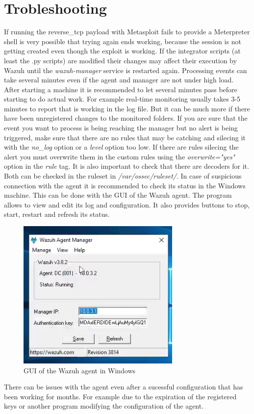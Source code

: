 \section*{Trobleshooting}
If running the reverse\_tcp payload with Metasploit fails to provide a Meterpreter shell is very possible that trying again ends working, because the session is not getting created even though the exploit is working.
\linej
\linej
If the integrator scripts (at least the .py scripts) are modified their changes may affect their execution by Wazuh until the \textit{wazuh-manager} service is restarted again.
\linej
\linej
Processing events can take several minutes even if the agent and manager are not under high load.
After starting a machine it is recommended to let several minutes pass before starting to do actual work.
\linej
For example real-time monitoring usually takes 3-5 minutes to report that is working in the log file.
But it can be much more if there have been unregistered changes to the monitored folders.
\linej
\linej
If you are sure that the event you want to process is being reaching the manager but no alert is being triggered, make sure that there are no rules that may be catching and silecing it with the \textit{no\_log} option or a \textit{level} option too low. If there are rules silecing the alert you must overwrite them in the custom rules using the \textit{overwrite="yes"} option in the \textit{rule} tag.
It is also important to check that there are decoders for it.
Both can be checked in the ruleset in \textit{/var/ossec/ruleset/}.
\linej
\linej
In case of suspicious connection with the agent it is recommended to check its status in the Windows machine.
This can be done with the GUI of the Wazuh agent.
The program allows to view and edit its log and configuration.
It also provides buttons to stop, start, restart and refresh its status.
\begin{figure}[H]
  \centering
	\includegraphics[width=.5\textwidth]{figuras/wazuh_agent_gui.png}
	\caption{GUI of the Wazuh agent in Windows}
\end{figure}
\linej
There can be issues with the agent even after a sucessful configuration that has been working for months.
For example due to the expiration of the registered keys or another program modifying the configuration of the agent.
